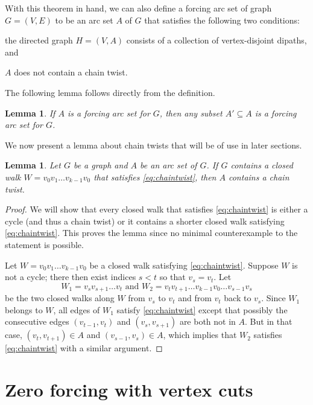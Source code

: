 \documentclass[12pt]{amsart}
\theoremstyle{plain}
\newtheorem{lemma}[theorem]{Lemma}
\theoremstyle{definition}
\begin{document}
With this theorem in hand, we can also define a forcing arc set of graph $G=(V, E)$ to be an arc set $A$ of $G$ that satisfies the following two conditions:
\begin{enumerate}[label=(Q\arabic*),start=2] {\sl 
\item[\ref{cond:fas1}] the directed graph $H=(V, A)$ consists of a collection of vertex-disjoint dipaths, and
\item\label{cond:fas3} $A$ does not contain a chain twist.}
\end{enumerate}

The following lemma follows directly from the definition.
\begin{lemma}\label{lem:subset}
If $A$ is a forcing arc set for $G$, then any subset $A'\subseteq A$ is a forcing arc set for $G$.
\end{lemma}

We now present a lemma about chain twists that will be of use in later sections. 

\begin{lemma}\label{lem:closedwalk}
Let $G$ be a graph and $A$ be an arc set of $G$.
If $G$ contains a closed walk $W=v_0v_1\dots v_{k-1}v_0 $ that satisfies \eqref{eq:chaintwist}, then $A$ contains a chain twist. 
\end{lemma}
\begin{proof}
We will show that every closed walk that satisfies \eqref{eq:chaintwist} is either a cycle (and thus a chain twist) or it contains a shorter closed walk satisfying \eqref{eq:chaintwist}. This proves the lemma since no minimal counterexample to the statement is possible.

Let $W=v_0v_1\dots v_{k-1}v_0 $ be a closed walk satisfying \eqref{eq:chaintwist}. 
Suppose $W$ is not a cycle; there then exist indices $s<t $ so that $v_s=v_t$. Let 
\[
W_1=v_sv_{s+1}\dots v_t\text{ and }W_2=v_tv_{t+1}\dots v_{k-1}v_0\dots v_{s-1}v_s
\]
be the two closed walks along $W$ from $v_s$ to $v_t$ and from $v_t$ back to $v_s$. 
Since $W_1$ belongs to $W$, all edges of $W_1$ satisfy \eqref{eq:chaintwist} except that possibly the consecutive edges $(v_{t-1},v_t)$ and $ (v_s,v_{s+1})$ are both not in $A$. 
But in that case, $(v_t,v_{t+1})\in A$ and $(v_{s-1},v_s)\in A$, which implies that $W_2$ satisfies \eqref{eq:chaintwist} with a similar argument. 
\end{proof}


\section{Zero forcing with vertex cuts}\label{sec:vertexcut}
\end{document}
